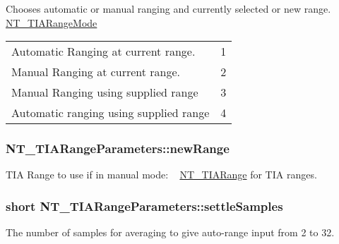 Chooses automatic or manual ranging and currently selected or new range. \hyperlink{group___common_ga17a2e7154218bc950c0568a08a1307a8}{N\+T\+\_\+\+T\+I\+A\+Range\+Mode} \tabulinesep=1mm
\begin{longtabu} spread 0pt [c]{*2{|X[-1]}|}
\hline
Automatic Ranging at current range.&1 \\
Manual Ranging at current range.&2 \\
Manual Ranging using supplied range&3 \\
Automatic ranging using supplied range&4 \\
\end{longtabu}


\subsubsection[{\texorpdfstring{new\+Range}{newRange}}]{ N\+T\+\_\+\+T\+I\+A\+Range\+Parameters\+::new\+Range}\hypertarget{struct_n_t___t_i_a_range_parameters_a02d3a0e8bb4c179914d26b5a79a79956}{}\label{struct_n_t___t_i_a_range_parameters_a02d3a0e8bb4c179914d26b5a79a79956}


T\+IA Range to use if in manual mode\+: ~\newline
 \hyperlink{group___common_ga2d700cb6733eb95975d787fb1915a74b}{N\+T\+\_\+\+T\+I\+A\+Range} for T\+IA ranges. 

\subsubsection[{\texorpdfstring{settle\+Samples}{settleSamples}}]{\setlength{\rightskip}{0pt plus 5cm}short N\+T\+\_\+\+T\+I\+A\+Range\+Parameters\+::settle\+Samples}\hypertarget{struct_n_t___t_i_a_range_parameters_ad242d8b828e74ea7aa1135b5e5b9126f}{}\label{struct_n_t___t_i_a_range_parameters_ad242d8b828e74ea7aa1135b5e5b9126f}


The number of samples for averaging to give auto-\/range input from 2 to 32. 

